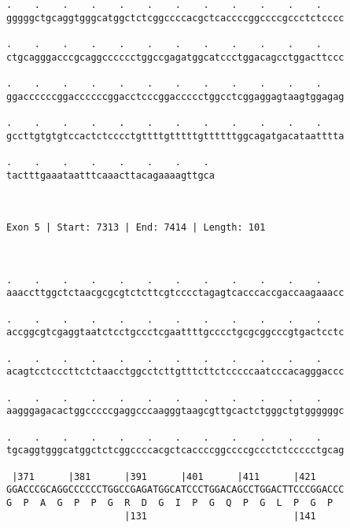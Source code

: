 \documentclass{article}
\begin{document}
\begin{Verbatim}
.    .    .    .    .    .    .    .    .    .    .    .    
gggggctgcaggtgggcatggctctcggccccacgctcaccccggccccgccctctcccc
                                                            
.    .    .    .    .    .    .    .    .    .    .    .    
ctgcagggacccgcaggcccccctggccgagatggcatccctggacagcctggacttccc
                                                            
.    .    .    .    .    .    .    .    .    .    .    .    
ggaccccccggaccccccggacctcccggaccccctggcctcggaggagtaagtggagag
                                                            
.    .    .    .    .    .    .    .    .    .    .    .    
gccttgtgtgtccactctcccctgttttgtttttgttttttggcagatgacataatttta
                                                            
.    .    .    .    .    .    .    . 
tactttgaaataatttcaaacttacagaaaagttgca
                                     
                                     
 
Exon 5 | Start: 7313 | End: 7414 | Length: 101



.    .    .    .    .    .    .    .    .    .    .    .    
aaaccttggctctaacgcgcgtctcttcgtcccctagagtcacccaccgaccaagaaacc
                                                            
.    .    .    .    .    .    .    .    .    .    .    .    
accggcgtcgaggtaatctcctgccctcgaattttgcccctgcgcggcccgtgactcctc
                                                            
.    .    .    .    .    .    .    .    .    .    .    .    
acagtcctcccttctctaacctggcctcttgtttcttctcccccaatcccacagggaccc
                                                            
.    .    .    .    .    .    .    .    .    .    .    .    
aagggagacactggcccccgaggcccaagggtaagcgttgcactctgggctgtggggggc
                                                            
.    .    .    .    .    .    .    .    .    .    .    .    
tgcaggtgggcatggctctcggccccacgctcaccccggccccgccctctccccctgcag
                                                            
 |371      |381      |391      |401      |411      |421     
GGACCCGCAGGCCCCCCTGGCCGAGATGGCATCCCTGGACAGCCTGGACTTCCCGGACCC
G  P  A  G  P  P  G  R  D  G  I  P  G  Q  P  G  L  P  G  P  
                     |131                          |141     
  

\end{Verbatim}
\end{document}
